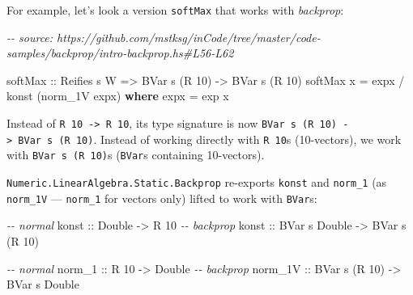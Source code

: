 \documentclass[]{article}
\newenvironment{Shaded}{}{}
\newcommand{\CommentTok}[1]{\textcolor[rgb]{0.38,0.63,0.69}{\textit{#1}}}
\newcommand{\DataTypeTok}[1]{\textcolor[rgb]{0.56,0.13,0.00}{#1}}
\newcommand{\DecValTok}[1]{\textcolor[rgb]{0.25,0.63,0.44}{#1}}
\newcommand{\FunctionTok}[1]{\textcolor[rgb]{0.02,0.16,0.49}{#1}}
\newcommand{\KeywordTok}[1]{\textcolor[rgb]{0.00,0.44,0.13}{\textbf{#1}}}
\newcommand{\NormalTok}[1]{#1}
\newcommand{\OperatorTok}[1]{\textcolor[rgb]{0.40,0.40,0.40}{#1}}
\newcommand{\OtherTok}[1]{\textcolor[rgb]{0.00,0.44,0.13}{#1}}
\begin{document}
For example, let's look a version \texttt{softMax} that works with
\emph{backprop}:

\begin{Shaded}
\begin{Highlighting}[]
\CommentTok{{-}{-} source: https://github.com/mstksg/inCode/tree/master/code{-}samples/backprop/intro{-}backprop.hs\#L56{-}L62}

\NormalTok{softMax}
\OtherTok{    ::} \DataTypeTok{Reifies}\NormalTok{ s }\DataTypeTok{W}
    \OtherTok{=\textgreater{}} \DataTypeTok{BVar}\NormalTok{ s (}\DataTypeTok{R} \DecValTok{10}\NormalTok{)}
    \OtherTok{{-}\textgreater{}} \DataTypeTok{BVar}\NormalTok{ s (}\DataTypeTok{R} \DecValTok{10}\NormalTok{)}
\NormalTok{softMax x }\OtherTok{=}\NormalTok{ expx }\OperatorTok{/}\NormalTok{ konst (norm\_1V expx)}
  \KeywordTok{where}
\NormalTok{    expx }\OtherTok{=} \FunctionTok{exp}\NormalTok{ x}
\end{Highlighting}
\end{Shaded}

Instead of \texttt{R\ 10\ -\textgreater{}\ R\ 10}, its type signature is now
\texttt{BVar\ s\ (R\ 10)\ -\textgreater{}\ BVar\ s\ (R\ 10)}. Instead of working
directly with \texttt{R\ 10}s (10-vectors), we work with
\texttt{BVar\ s\ (R\ 10)}s (\texttt{BVar}s containing 10-vectors).

\texttt{Numeric.LinearAlgebra.Static.Backprop} re-exports \texttt{konst} and
\texttt{norm\_1} (as \texttt{norm\_1V} --- \texttt{norm\_1} for vectors only)
lifted to work with \texttt{BVar}s:

\begin{Shaded}
\begin{Highlighting}[]
\CommentTok{{-}{-} normal}
\OtherTok{konst   ::}        \DataTypeTok{Double} \OtherTok{{-}\textgreater{}}         \DataTypeTok{R} \DecValTok{10}
\CommentTok{{-}{-} backprop}
\OtherTok{konst   ::} \DataTypeTok{BVar}\NormalTok{ s }\DataTypeTok{Double} \OtherTok{{-}\textgreater{}} \DataTypeTok{BVar}\NormalTok{ s (}\DataTypeTok{R} \DecValTok{10}\NormalTok{)}

\CommentTok{{-}{-} normal}
\OtherTok{norm\_1  ::}         \DataTypeTok{R} \DecValTok{10}  \OtherTok{{-}\textgreater{}}        \DataTypeTok{Double}
\CommentTok{{-}{-} backprop}
\OtherTok{norm\_1V ::} \DataTypeTok{BVar}\NormalTok{ s (}\DataTypeTok{R} \DecValTok{10}\NormalTok{) }\OtherTok{{-}\textgreater{}} \DataTypeTok{BVar}\NormalTok{ s }\DataTypeTok{Double}
\end{Highlighting}
\end{Shaded}
\end{document}
